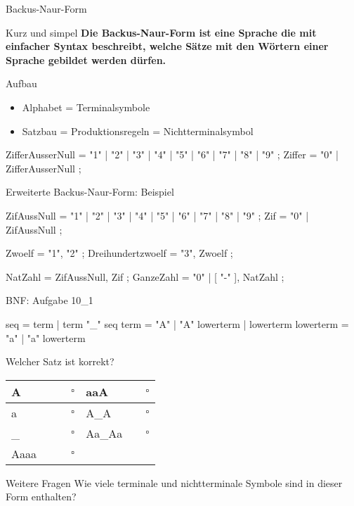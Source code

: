 \ifnum\conditionmacro=1 \documentclass[handout,usenames,dvipsnames]{beamer}\fi
\begin{document}
\begin{frame}[fragile]{Backus-Naur-Form}
\begin{block}{Kurz und simpel}
\textbf{Die Backus-Naur-Form ist eine Sprache die mit einfacher Syntax beschreibt, welche Sätze mit den Wörtern einer Sprache gebildet werden dürfen.}
\end{block}
\begin{block}{Aufbau}
\begin{itemize}
\item Alphabet = Terminalsymbole
\item Satzbau = Produktionsregeln = Nichtterminalsymbol
\end{itemize}
\end{block}

\begin{TPPython}
ZifferAusserNull = "1" | "2" | "3" | "4" | "5" | "6" | "7" | "8" | "9" ;
Ziffer = "0" | ZifferAusserNull ;
\end{TPPython}
\end{frame}

\begin{frame}[fragile]{Erweiterte Backus-Naur-Form: Beispiel}
\begin{TFPython}
ZifAussNull = "1" | "2" | "3" | "4" | "5" | "6" | "7" | "8" | "9" ;
Zif = "0" | ZifAussNull ;

Zwoelf = "1", "2" ;
Dreihundertzwoelf = "3", Zwoelf ;

NatZahl = ZifAussNull, { Zif } ;
GanzeZahl = "0" | [ "-" ], NatZahl ;
\end{TFPython}
\end{frame}

\begin{frame}[fragile]{BNF: Aufgabe 10\_1}

\begin{TPPython}
seq = term | term "_" seq
term = "A" | "A" lowerterm | lowerterm
lowerterm = "a" | "a" lowerterm
\end{TPPython}

\begin{block}{Welcher Satz ist korrekt?}
\begin{tabular}{|p{0.4\linewidth}|l|p{0.4\linewidth}|l|}
\hline
A&$\square$&aaA&$\square$\\\hline
a&$\square$&A\_A&$\square$\\\hline
\_ &$\square$&Aa\_Aa&$\square$\\\hline
Aaaa&$\square$&&\\\hline
\end{tabular}
\end{block}

\begin{block}{Weitere Fragen}
Wie viele terminale und nichtterminale Symbole sind in dieser Form enthalten?
\end{block}
\end{frame}
\end{document}
